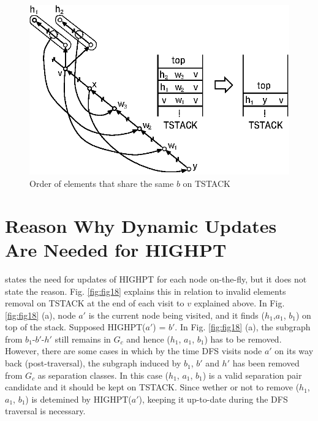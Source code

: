 \documentclass[twoside,twocolumn]{article}
\begin{document}
\begin{figure}[!htb]
\centering
\includegraphics[scale=0.7]{spqr_fig17.eps}
\caption{Order of elements that share the same $b$ on TSTACK}
\label{fig:fig17}
\end{figure}

\section{Reason Why Dynamic Updates Are Needed for HIGHPT}

\cite{GM01} states the need for updates of {\ttfamily HIGHPT} for each node on-the-fly, but
it does not state the reason. Fig. \ref{fig:fig18} explains this in relation to
invalid elements removal on {\ttfamily TSTACK} at the end of each visit to $v$ explained
above. In Fig. \ref{fig:fig18} (a), node $a'$ is the current node being visited, and it finds
($h_1$,$a_1$, $b_1$) on top of the stack. Supposed {\ttfamily HIGHPT($a'$) = $b'$}.  In Fig. \ref{fig:fig18} (a),
the subgraph from $b_1$-$b'$-$h'$ still remains in $G_c$ and hence ($h_1$, $a_1$, $b_1$) has
to be removed. However, there are some cases in which by the time DFS visits
node $a'$ on its way back (post-traversal), the subgraph induced by $b_1$, $b'$ and $h'$
has been removed from $G_c$ as separation classes. In this case ($h_1$, $a_1$, $b_1$) is a valid
separation pair candidate and it should be kept on {\ttfamily TSTACK}. Since wether
or not to remove ($h_1$, $a_1$, $b_1$) is detemined by {\ttfamily HIGHPT($a'$)}, keeping it up-to-date
during the DFS traversal is necessary.
\end{document}
